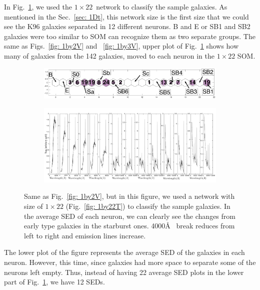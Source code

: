             In Fig.~\ref{fig: 1by22V}, we used the $1\times22$~network to classify the sample galaxies.
            As mentioned in the Sec.~\ref{sec: 1Dt}, this network size is the first size that we could see the K96 galaxies separated in 12 different neurons.
            B and E or SB1 and SB2 galaxies were too similar to SOM can recognize them as two separate groups.
            The same as Figs.~\ref{fig: 1by2V} and ~\ref{fig: 1by3V}, upper plot of Fig.~\ref{fig: 1by22V} shows how many of galaxies from the 142 galaxies, moved to each neuron in the $1\times22$ SOM.
            \begin{figure}
                \begin{subfigure}[b]{0.9\textwidth}
                    \centering
                    \includegraphics[width=\textwidth]{../images0.01/1d/hit_v_1_by_22_n.png}
                \end{subfigure}
                \hfill
                \begin{subfigure}[b]{0.9\textwidth}
                     \includegraphics[width=\textwidth]{../images0.01/1d/SED_total1by22.png}
                \end{subfigure}
                \caption{Same as Fig.~\ref{fig: 1by2V}, but in this figure, we used a network with size of $1\times22$ (Fig.~\ref{fig: 1by22T}) to classify the sample galaxies. In the average SED of each neuron, we can clearly see the changes from early type galaxies in the starburst ones. 4000\AA~ break reduces from left to right and emission lines increase.}
                \label{fig: 1by22V}
            \end{figure}
            The lower plot of the figure represents the average SED of the galaxies in each neuron.
            However, this time, since galaxies had more space to separate some of the neurons left empty. 
            Thus, instead of having 22 average SED plots in the lower part of Fig.~\ref{fig: 1by22V}, we have 12 SEDs.
            
